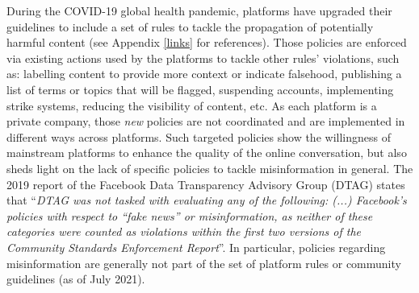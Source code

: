 \documentclass{article}
\begin{document}

\smallskip

During the COVID-19 global health pandemic, platforms have upgraded their guidelines to include a set of rules to tackle the propagation of potentially harmful content (see Appendix \ref{links} for references). Those policies are enforced via existing actions used by the platforms to tackle other rules' violations, such as: labelling content to provide more context or indicate falsehood, publishing a list of terms or topics that will be flagged, suspending accounts, implementing strike systems, reducing the visibility of content, etc. As each platform is a private company, those {\it new} policies are not coordinated and are implemented in different ways across platforms. Such targeted policies show the willingness of mainstream platforms to enhance the quality of the online conversation, but also sheds light on the lack of specific policies to tackle misinformation in general. The 2019 report of the Facebook Data Transparency Advisory Group (DTAG) states that ``{\it DTAG was not tasked with evaluating any of the following: (...) Facebook’s policies with respect to “fake news” or misinformation, as neither of these categories were counted as violations within the first two versions of the Community Standards Enforcement Report}''. In particular, policies regarding misinformation are generally not part of the set of platform rules or community guidelines (as of July 2021).  %

\smallskip
 
\end{document}
